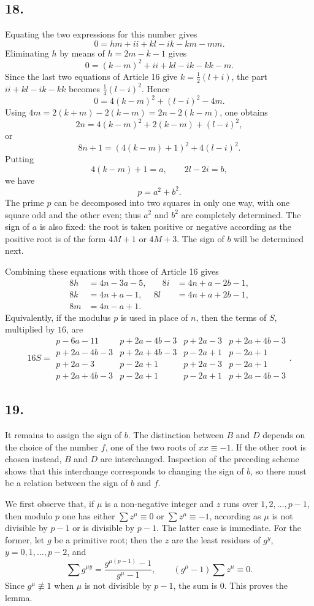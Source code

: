 \documentclass[12pt]{article}
\begin{document}
\subsection*{18.}

Equating the two expressions for this number gives
\[
0=hm+ii+kl-ik-km-mm.
\]
Eliminating $h$ by means of $h=2m-k-1$ gives
\[
0=(k-m)^2+ii+kl-ik-kk-m.
\]
Since the last two equations of Article 16 give $k=\frac12(l+i)$, the part $ii+kl-ik-kk$ becomes $\frac14(l-i)^2$. Hence
\[
0=4(k-m)^2+(l-i)^2-4m.
\]
Using $4m=2(k+m)-2(k-m)=2n-2(k-m)$, one obtains
\[
2n=4(k-m)^2+2(k-m)+(l-i)^2,
\]
or
\[
8n+1=(4(k-m)+1)^2+4(l-i)^2.
\]
Putting
\[
4(k-m)+1=a,\qquad 2l-2i=b,
\]
we have
\[
p=a^2+b^2.
\]
The prime $p$ can be decomposed into two squares in only one way, with one square odd and the other even; thus $a^2$ and $b^2$ are completely determined. The sign of $a$ is also fixed: the root is taken positive or negative according as the positive root is of the form $4M+1$ or $4M+3$. The sign of $b$ will be determined next.

Combining these equations with those of Article 16 gives
\[
\begin{aligned}
8h&=4n-3a-5,&\quad 8i&=4n+a-2b-1,\\
8k&=4n+a-1,& 8l&=4n+a+2b-1,\\
8m&=4n-a+1.
\end{aligned}
\]
Equivalently, if the modulus $p$ is used in place of $n$, then the terms of $S$, multiplied by $16$, are
\[
16S=\begin{array}{rrrr}
p-6a-11&p+2a-4b-3&p+2a-3&p+2a+4b-3\\
p+2a-4b-3&p+2a+4b-3&p-2a+1&p-2a+1\\
p+2a-3&p-2a+1&p+2a-3&p-2a+1\\
p+2a+4b-3&p-2a+1&p-2a+1&p+2a-4b-3
\end{array}.
\]

\subsection*{19.}

It remains to assign the sign of $b$. The distinction between $B$ and $D$ depends on the choice of the number $f$, one of the two roots of $xx\equiv-1$. If the other root is chosen instead, $B$ and $D$ are interchanged. Inspection of the preceding scheme shows that this interchange corresponds to changing the sign of $b$, so there must be a relation between the sign of $b$ and $f$.

We first observe that, if $\mu$ is a non-negative integer and $z$ runs over $1,2,\ldots,p-1$, then modulo $p$ one has either $\sum z^\mu\equiv0$ or $\sum z^\mu\equiv-1$, according as $\mu$ is not divisible by $p-1$ or is divisible by $p-1$. The latter case is immediate. For the former, let $g$ be a primitive root; then the $z$ are the least residues of $g^y$, $y=0,1,\ldots,p-2$, and
\[
\sum g^{\mu y}=\frac{g^{\mu(p-1)}-1}{g^\mu-1},\qquad
(g^\mu-1)\sum z^\mu\equiv0.
\]
Since $g^\mu\not\equiv1$ when $\mu$ is not divisible by $p-1$, the sum is $0$. This proves the lemma.
\end{document}
